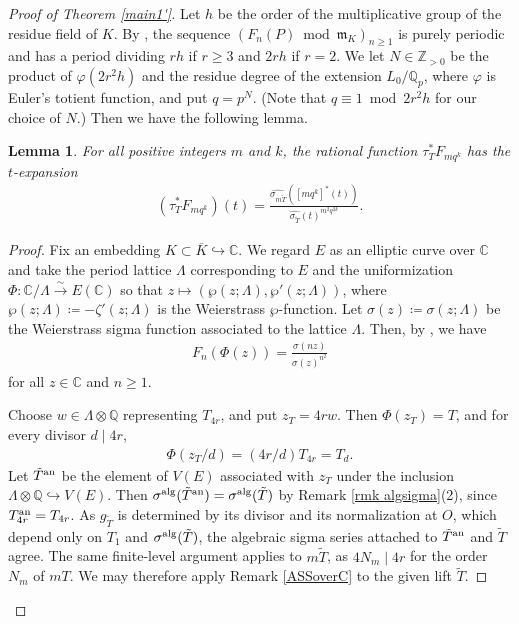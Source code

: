 \documentclass[11pt]{amsart}
\newtheorem{lem}[thm]{Lemma}
\theoremstyle{definition}
\begin{document}
\begin{proof}[Proof of Theorem \ref{main1'}]
Let $h$ be the order of the multiplicative group of the residue field of $K$. 
By \cite[Corollary 9]{Si05a}, the sequence $(F_n(P) \bmod \mathfrak{m}_K )_{n \geq 1}$ is purely periodic and has a period dividing $rh$ if $r \geq 3$ and $2rh$ if $r=2$. 
We let $N \in \mathbb{Z}_{>0}$ be the product of $\varphi (2r^2h)$ and the residue degree of the extension $L_0/\mathbb{Q}_p$, where $\varphi$ is Euler's totient function, and put $q=p^N$. (Note that $q \equiv 1 \bmod 2r^2h$ for our choice of $N$.) Then we have the following lemma.

\begin{lem}\label{lem t-exp of F}
For all positive integers $m$ and $k$, the rational function $\tau_T^\ast F_{mq^k}$ has the $t$-expansion
%
\begin{align}\label{t-exp of F}
(\tau_T^\ast F_{mq^k})(t)=\frac{\widehat{\sigma_{m\tilde{T}}}([mq^k]^{\ast}(t))}{\widehat{\sigma_{\tilde{T}}}(t)^{m^2q^{2k}}}.
\end{align}
%
\end{lem}

\begin{proof}
Fix an embedding $K \subset \overline{K} \hookrightarrow \mathbb{C}$. We regard $E$ as an elliptic curve over $\mathbb{C}$ and take the period lattice $\Lambda$ corresponding to $E$ and the uniformization $\Phi:\mathbb{C}/\Lambda \overset{\sim}{\rightarrow} E(\mathbb{C})$ so that $z \mapsto (\wp(z; \Lambda), \wp'(z; \Lambda))$, where $\wp(z; \Lambda) \coloneqq -\zeta'(z; \Lambda)$ is the Weierstrass $\wp$-function. Let $\sigma(z)\coloneqq \sigma(z;\Lambda)$ be the Weierstrass sigma function associated to the lattice $\Lambda$. Then, by \cite[Lemma 7]{Si05a}, we have
%
\begin{align}\label{Lem7}
F_n(\Phi(z))=\frac{\sigma(nz)}{\sigma(z)^{n^2}}
\end{align}
%
for all $z \in \mathbb{C}$ and $n\geq 1$. 

Choose $w \in \Lambda\otimes\mathbb{Q}$ representing $T_{4r}$, and put $z_T=4rw$. Then $\Phi (z_T)=T$, and for every divisor $d \mid 4r$, 
%
\begin{align*}
\Phi (z_T/d)=(4r/d)T_{4r}=T_d.
\end{align*}
%
Let $\tilde{T}^{\rm an}$ be the element of $V(E)$ associated with $z_T$
under the inclusion $\Lambda \otimes \mathbb{Q} \hookrightarrow V(E)$.
Then $\sigma^{\rm alg}(\tilde{T}^{\rm an})=\sigma^{\rm alg}(\tilde{T})$ by
Remark \ref{rmk algsigma}(2), since $T^{\rm an}_{4r}=T_{4r}$.
As $g_{\tilde{T}}$ is determined by its divisor and its normalization at
$O$, which depend only on $T_1$ and $\sigma^{\rm alg}(\tilde{T})$, the
algebraic sigma series attached to $\tilde{T}^{\rm an}$ and $\tilde{T}$
agree. The same finite-level argument applies to $m\tilde{T}$, as
$4N_m \mid 4r$ for the order $N_m$ of $mT$. We may therefore apply
Remark \ref{ASSoverC} to the given lift $\tilde{T}$.



\end{proof}
\end{proof}
\end{document}
